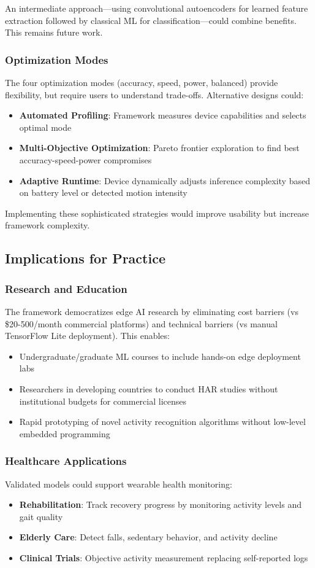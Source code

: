An intermediate approach—using convolutional autoencoders for learned feature extraction followed by classical ML for classification—could combine benefits. This remains future work.

\subsubsection{Optimization Modes}
The four optimization modes (accuracy, speed, power, balanced) provide flexibility, but require users to understand trade-offs. Alternative designs could:
\begin{itemize}
    \item \textbf{Automated Profiling}: Framework measures device capabilities and selects optimal mode
    \item \textbf{Multi-Objective Optimization}: Pareto frontier exploration to find best accuracy-speed-power compromises
    \item \textbf{Adaptive Runtime}: Device dynamically adjusts inference complexity based on battery level or detected motion intensity
\end{itemize}

Implementing these sophisticated strategies would improve usability but increase framework complexity.

\subsection{Implications for Practice}

\subsubsection{Research and Education}
The framework democratizes edge AI research by eliminating cost barriers (vs \$20-500/month commercial platforms) and technical barriers (vs manual TensorFlow Lite deployment). This enables:
\begin{itemize}
    \item Undergraduate/graduate ML courses to include hands-on edge deployment labs
    \item Researchers in developing countries to conduct HAR studies without institutional budgets for commercial licenses
    \item Rapid prototyping of novel activity recognition algorithms without low-level embedded programming
\end{itemize}

\subsubsection{Healthcare Applications}
Validated models could support wearable health monitoring:
\begin{itemize}
    \item \textbf{Rehabilitation}: Track recovery progress by monitoring activity levels and gait quality
    \item \textbf{Elderly Care}: Detect falls, sedentary behavior, and activity decline
    \item \textbf{Clinical Trials}: Objective activity measurement replacing self-reported logs
\end{itemize}

